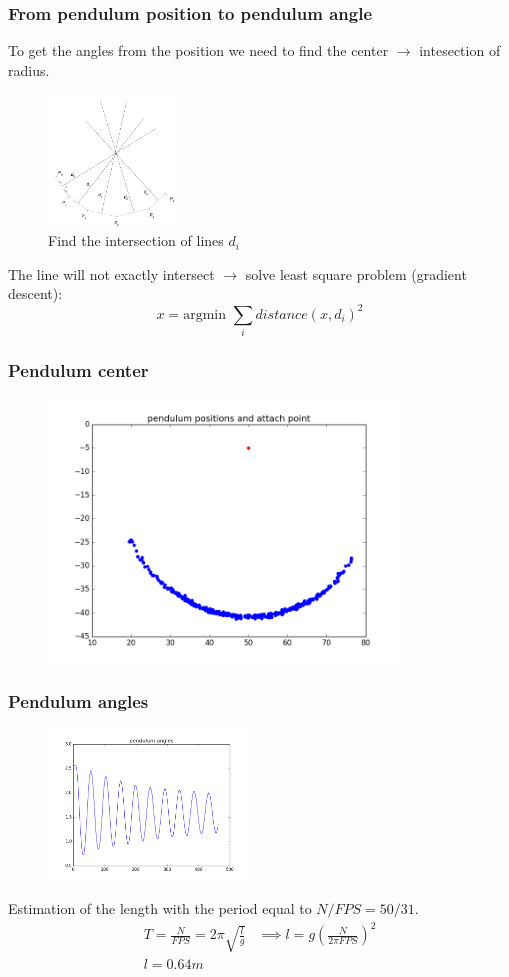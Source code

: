 \documentclass{beamer}
\begin{document}
\begin{frame}
\frametitle{From pendulum position to pendulum angle}
To get the angles from the position we need to find the center $\rightarrow$ intesection of radius.
\begin{figure}
  \captionsetup{labelformat=empty}
  \includegraphics[height=3.5cm]{find_center.png}
  \caption{Find the intersection of lines $d_i$}
\end{figure}
The line will not exactly intersect $\rightarrow$ solve least square problem (gradient descent):
\[
  x = \text{argmin }\sum_i distance(x, d_i)^2
\]
\end{frame}

\begin{frame}
  \frametitle{Pendulum center}
  \begin{figure}
    \includegraphics[height=7cm]{pendulum_positions_with_center.png}
  \end{figure}
\end{frame}

\begin{frame}
  \frametitle{Pendulum angles}
  \begin{figure}
    \includegraphics[height=4cm]{pendulum_angles.png}
  \end{figure}
  Estimation of the length with the period equal to $N / FPS = 50 / 31$.
  \begin{align*}
    T = \frac{N}{FPS} = 2 \pi \sqrt{\frac{l}{g}} &\implies l = g \left( \frac{N}{2 \pi FPS} \right)^2\\
    l  = 0.64m &\\
  \end{align*}
\end{frame}
\end{document}
